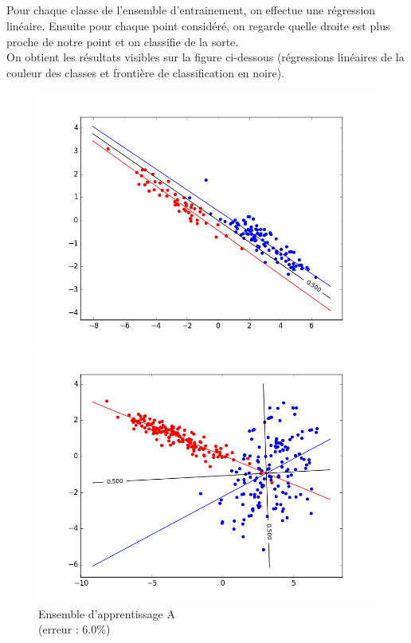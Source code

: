 \documentclass[paper=a4, fontsize=11pt]{article}
\begin{document}
\subsection{}
Pour chaque classe de l'ensemble d'entrainement, on effectue une régression linéaire. Ensuite pour chaque point considéré, on regarde quelle droite est plus proche de notre point et on classifie de la sorte. \\
On obtient les résultats visibles sur la figure ci-dessous (régressions linéaires de la couleur des classes et frontière de classification en noire).\\
\begin{figure}[h]
 \begin{minipage}[b]{.3\linewidth}
 \begin{center}
 \includegraphics[scale=0.25]{figures/lin_reg_A_train.png}
  \caption*{Ensemble d'apprentissage A \\ (erreur : $6.0\%$)}
 \end{center}
 \end{minipage} \hfill
 \begin{minipage}[b]{.3\linewidth}
  \includegraphics[scale=0.25]{figures/lin_reg_B_train.png}

\end{minipage}
\end{figure}
\end{document}
